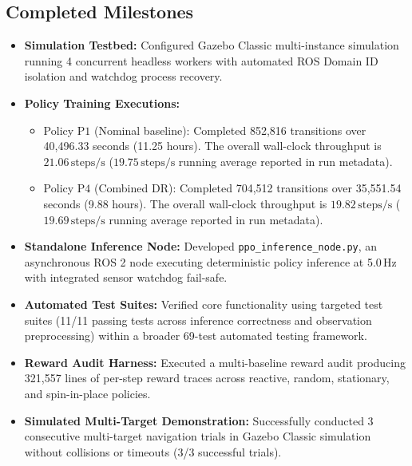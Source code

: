 \documentclass[conference]{IEEEtran}
\begin{document}
\subsection{Completed Milestones}
\begin{itemize}
    \item \textbf{Simulation Testbed:} Configured Gazebo Classic multi-instance simulation running 4 concurrent headless workers with automated ROS Domain ID isolation and watchdog process recovery.
    \item \textbf{Policy Training Executions:}
    \begin{itemize}
        \item Policy $\text{P1}$ (Nominal baseline): Completed 852,816 transitions over 40,496.33 seconds (11.25 hours). The overall wall-clock throughput is $21.06\,\text{steps/s}$ ($19.75\,\text{steps/s}$ running average reported in run metadata).
        \item Policy $\text{P4}$ (Combined DR): Completed 704,512 transitions over 35,551.54 seconds (9.88 hours). The overall wall-clock throughput is $19.82\,\text{steps/s}$ ($19.69\,\text{steps/s}$ running average reported in run metadata).
    \end{itemize}
    \item \textbf{Standalone Inference Node:} Developed \texttt{ppo\_inference\_node.py}, an asynchronous ROS 2 node executing deterministic policy inference at 5.0\,Hz with integrated sensor watchdog fail-safe.
    \item \textbf{Automated Test Suites:} Verified core functionality using targeted test suites (11/11 passing tests across inference correctness and observation preprocessing) within a broader 69-test automated testing framework.
    \item \textbf{Reward Audit Harness:} Executed a multi-baseline reward audit producing 321,557 lines of per-step reward traces across reactive, random, stationary, and spin-in-place policies.
    \item \textbf{Simulated Multi-Target Demonstration:} Successfully conducted 3 consecutive multi-target navigation trials in Gazebo Classic simulation without collisions or timeouts (3/3 successful trials).
\end{itemize}
\end{document}
